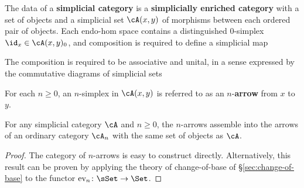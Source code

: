 \begin{definition}\label{defn:simplicial-category}
\leanok
{}

The data of a \textbf{simplicial category} is a \textbf{simplicially enriched category} with a set of objects and a simplicial set $\cA(x,y)$ of morphisms between each ordered pair of objects. Each endo-hom space contains a distinguished 0-simplex $\id_x \in \cA(x,y)_0$, and composition is required to define a simplicial map
  \begin{center}
  \end{center} The composition is required to be associative and unital, in a sense expressed by the commutative diagrams of simplicial sets
  \begin{center}
  \end{center}
\end{definition}

\begin{definition}\label{defn:n-arrow}
For each $n \geq 0$, an $n$-simplex in $\cA(x,y)$ is referred to as an $n$-\textbf{arrow} from $x$ to $y$.
\end{definition}

\begin{lemma}\label{lem:cat-of-n-arrows} For any simplicial category $\cA$ and $n \geq 0$,
the $n$-arrows assemble into the arrows of an ordinary category $\cA_n$ with the same set of objects as $\cA$.
\end{lemma}
\begin{proof}
The category of $n$-arrows is easy to construct directly. Alternatively, this result can be proven by applying the theory of change-of-base of \S\ref{sec:change-of-base} to the functor $\textup{ev}_n \colon \sSet \to \Set$.
\end{proof}

